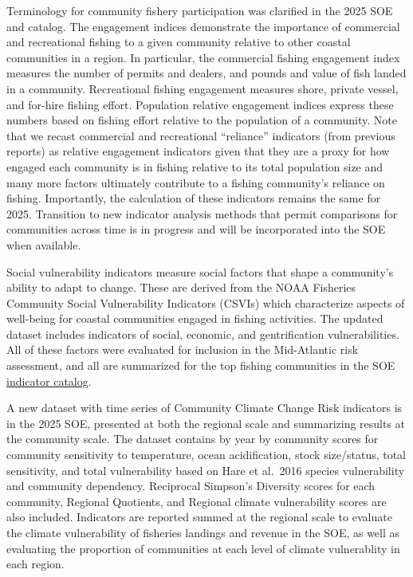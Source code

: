 \documentclass[
  10pt,
]{article}
\begin{document}
Terminology for community fishery participation was clarified in the
2025 SOE and catalog. The engagement indices demonstrate the importance
of commercial and recreational fishing to a given community relative to
other coastal communities in a region. In particular, the commercial
fishing engagement index measures the number of permits and dealers, and
pounds and value of fish landed in a community. Recreational fishing
engagement measures shore, private vessel, and for-hire fishing effort.
Population relative engagement indices express these numbers based on
fishing effort relative to the population of a community. Note that we
recast commercial and recreational ``reliance'' indicators (from
previous reports) as relative engagement indicators given that they are
a proxy for how engaged each community is in fishing relative to its
total population size and many more factors ultimately contribute to a
fishing community's reliance on fishing. Importantly, the calculation of
these indicators remains the same for 2025. Transition to new indicator
analysis methods that permit comparisons for communities across time is
in progress and will be incorporated into the SOE when available.

Social vulnerability indicators measure social factors that shape a
community's ability to adapt to change. These are derived from the NOAA
Fisheries Community Social Vulnerability Indicators (CSVIs) which
characterize aspects of well-being for coastal communities engaged in
fishing activities. The updated dataset includes indicators of social,
economic, and gentrification vulnerabilities. All of these factors were
evaluated for inclusion in the Mid-Atlantic risk assessment, and all are
summarized for the top fishing communities in the SOE
\href{https://noaa-edab.github.io/catalog/engagement.html}{indicator
catalog}.

A new dataset with time series of Community Climate Change Risk
indicators is in the 2025 SOE, presented at both the regional scale and
summarizing results at the community scale. The dataset contains by year
by community scores for community sensitivity to temperature, ocean
acidification, stock size/status, total sensitivity, and total
vulnerability based on Hare et al.~2016 species vulnerability and
community dependency. Reciprocal Simpson's Diversity scores for each
community, Regional Quotients, and Regional climate vulnerability scores
are also included. Indicators are reported summed at the regional scale
to evaluate the climate vulnerability of fisheries landings and revenue
in the SOE, as well as evaluating the proportion of communities at each
level of climate vulnerablity in each region.
\end{document}
